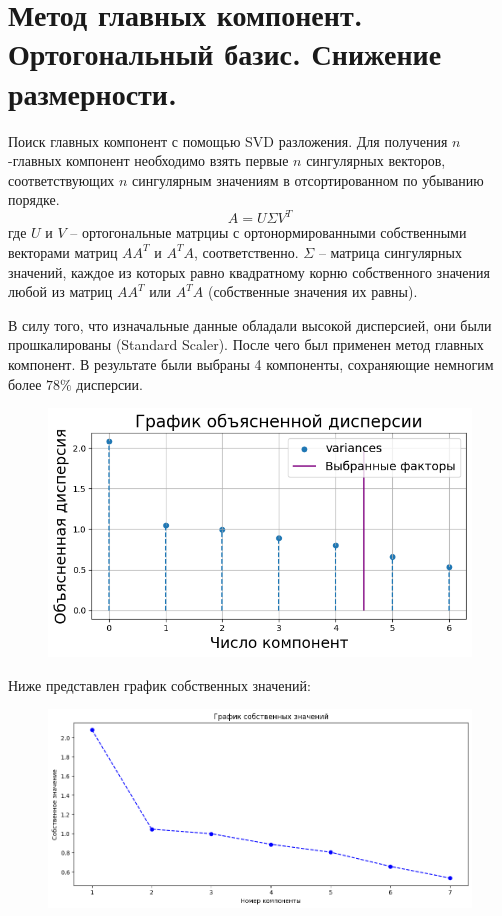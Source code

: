 \documentclass[12pt]{report}
\begin{document}
\section{Метод главных компонент. Ортогональный базис. Снижение размерности.}

Поиск главных компонент с помощью SVD разложения. Для получения $n$-главных компонент необходимо взять первые $n$ сингулярных векторов, соответствующих $n$ сингулярным значениям в отсортированном по убыванию порядке. 
\[
  A = U\Sigma V^T
\]
где $U$ и $V$ -- ортогональные матрциы с ортонормированными собственными векторами матриц $AA^T$ и $A^TA$, соответственно. $\Sigma$ -- матрица сингулярных значений, каждое из которых равно квадратному корню собственного значения любой из матриц  $AA^T$ или $A^TA$ (собственные значения их равны).
\par В силу того, что изначальные данные обладали высокой дисперсией, они были прошкалированы (Standard Scaler). После чего был применен метод главных компонент. В результате были выбраны 4 компоненты, сохраняющие немногим более $78\%$ дисперсии.
\begin{figure}[H]
  \centering
  \includegraphics[scale=0.4]{./imgs/explained_var.png}
\end{figure}
Ниже представлен график собственных значений:
\begin{figure}[H]
  \centering
  \includegraphics[scale=0.5]{./imgs/eigen_values.png}  
\end{figure}
\end{document}
